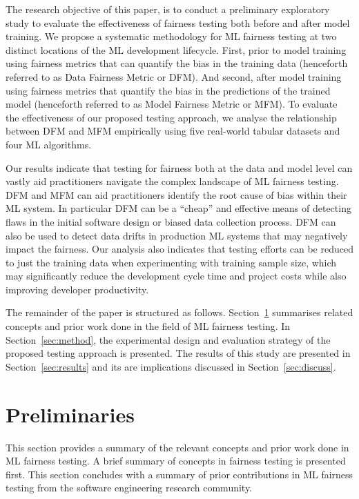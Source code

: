 \documentclass{article}
\begin{document}
The research objective of this paper, is to conduct a preliminary
exploratory study to evaluate the effectiveness of fairness testing
both before and after model training. We propose a systematic
methodology for ML fairness testing at two distinct locations of the
ML development lifecycle. First, prior to model training using
fairness metrics that can quantify the bias in the training data
(henceforth referred to as Data Fairness Metric or DFM). And second,
after model training using fairness metrics that quantify the bias in
the predictions of the trained model (henceforth referred to as Model
Fairness Metric or MFM). To evaluate the effectiveness of our proposed
testing approach, we analyse the relationship between DFM and MFM
empirically using five real-world tabular datasets and four ML
algorithms.


Our results indicate that testing for fairness both at the data and
model level can vastly aid practitioners navigate the complex
landscape of ML fairness testing. DFM and MFM can aid practitioners
identify the root cause of bias within their ML system. In particular
DFM can be a ``cheap'' and effective means of detecting flaws in the
initial software design or biased data collection process. DFM can
also be used to detect data drifts in production ML systems that may
negatively impact the fairness. Our analysis also indicates that
testing efforts can be reduced to just the training data when
experimenting with training sample size, which may significantly
reduce the development cycle time and project costs while also
improving developer productivity.

The remainder of the paper is structured as follows.
Section \ref{sec:related} summarises related concepts and prior work
done in the field of ML fairness testing. In Section \ref{sec:method},
the experimental design and evaluation strategy of the proposed
testing approach is presented. The results of this study are presented
in Section \ref{sec:results} and its are implications discussed in
Section \ref{sec:discuss}.

\section{Preliminaries}\label{sec:related}
This section provides a summary of the relevant concepts and prior
work done in ML fairness testing. A brief summary of concepts in
fairness testing is presented first. This section concludes with a
summary of prior contributions in ML fairness testing from the
software engineering research community.
\end{document}
